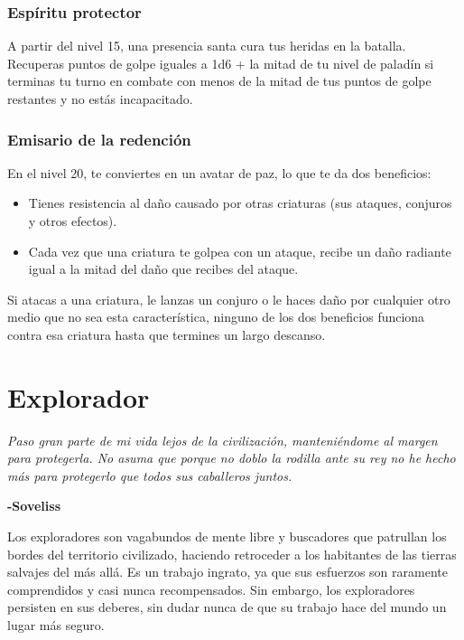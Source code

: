 \documentclass[a4paper,twocolumn,openany,10pt]{dndbook}
\begin{document}
\subsubsection{Espíritu protector}
A partir del nivel 15, una presencia santa cura tus heridas en la batalla. Recuperas puntos de golpe iguales a 1d6 + la mitad de
tu nivel de paladín si terminas tu turno en combate con menos de la mitad de tus puntos de golpe restantes y no estás
incapacitado. 

\subsubsection{Emisario de la redención}
En el nivel 20, te conviertes en un avatar de paz, lo que te da dos beneficios:

\begin{itemize}
\item Tienes resistencia al daño causado por otras criaturas (sus ataques, conjuros y otros efectos).
\item Cada vez que una criatura te golpea con un ataque, recibe un daño radiante igual a la mitad del daño que recibes del ataque.
\end{itemize}

Si atacas a una criatura, le lanzas un conjuro o le haces daño por cualquier otro medio que no sea esta característica, ninguno
de los dos beneficios funciona contra esa criatura hasta que termines un largo descanso. 

\section{Explorador}
\begin{quotebox}
	\textit{Paso gran parte de mi vida lejos de la civilización, manteniéndome al margen para protegerla. No asuma que porque no
	doblo la rodilla ante su rey no he hecho más para protegerlo que todos sus caballeros juntos.}

	\begin{flushright}
	\textbf{-Soveliss}
	\end{flushright}
\end{quotebox}

Los exploradores son vagabundos de mente libre y buscadores que patrullan los bordes del territorio civilizado, haciendo
retroceder a los habitantes de las tierras salvajes del más allá. Es un trabajo ingrato, ya que sus esfuerzos son raramente
comprendidos y casi nunca recompensados. Sin embargo, los exploradores persisten en sus deberes, sin dudar nunca de que su
trabajo hace del mundo un lugar más seguro.
\end{document}
